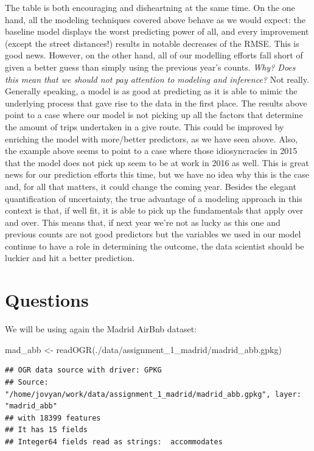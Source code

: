 \documentclass[
]{book}
\newenvironment{Shaded}{\begin{snugshade}}{\end{snugshade}}
\newcommand{\FunctionTok}[1]{\textcolor[rgb]{0.00,0.00,0.00}{#1}}
\newcommand{\NormalTok}[1]{#1}
\newcommand{\OtherTok}[1]{\textcolor[rgb]{0.56,0.35,0.01}{#1}}
\newcommand{\StringTok}[1]{\textcolor[rgb]{0.31,0.60,0.02}{#1}}
\begin{document}
The table is both encouraging and disheartning at the same time. On the one hand, all the modeling techniques covered above behave as we would expect: the baseline model displays the worst predicting power of all, and every improvement (except the street distances!) results in notable decreases of the RMSE. This is good news. However, on the other hand, all of our modelling efforts fall short of given a better guess than simply using the previous year's counts. \emph{Why? Does this mean that we should not pay attention to modeling and inference?} Not really. Generally speaking, a model is as good at predicting as it is able to mimic the underlying process that gave rise to the data in the first place. The results above point to a case where our model is not picking up all the factors that determine the amount of trips undertaken in a give route. This could be improved by enriching the model with more/better predictors, as we have seen above. Also, the example above seems to point to a case where those idiosyncracies in 2015 that the model does not pick up seem to be at work in 2016 as well. This is great news for our prediction efforts this time, but we have no idea why this is the case and, for all that matters, it could change the coming year. Besides the elegant quantification of uncertainty, the true advantage of a modeling approach in this context is that, if well fit, it is able to pick up the fundamentals that apply over and over. This means that, if next year we're not as lucky as this one and previous counts are not good predictors but the variables we used in our model continue to have a role in determining the outcome, the data scientist should be luckier and hit a better prediction.

\hypertarget{questions-1}{%
\section{Questions}\label{questions-1}}

We will be using again the Madrid AirBnb dataset:

\begin{Shaded}
\begin{Highlighting}[]
\NormalTok{mad\_abb }\OtherTok{\textless{}{-}} \FunctionTok{readOGR}\NormalTok{(}\StringTok{\textquotesingle{}./data/assignment\_1\_madrid/madrid\_abb.gpkg\textquotesingle{}}\NormalTok{)}
\end{Highlighting}
\end{Shaded}

\begin{verbatim}
## OGR data source with driver: GPKG 
## Source: "/home/jovyan/work/data/assignment_1_madrid/madrid_abb.gpkg", layer: "madrid_abb"
## with 18399 features
## It has 15 fields
## Integer64 fields read as strings:  accommodates
\end{verbatim}
\end{document}
